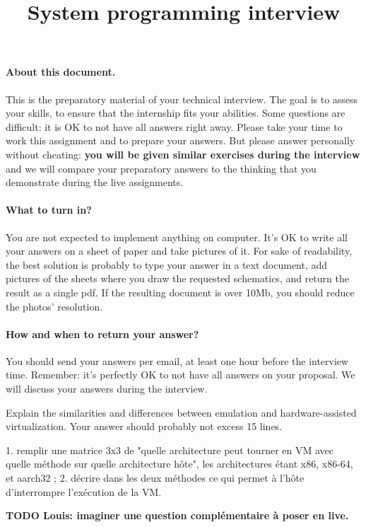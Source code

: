 \documentclass[10pt]{article}\usepackage[enonce]{exemptty}
\begin{document}
\title{System programming interview}
\TDmodule{}
\rhead{}
\maketitle

\vspace{-2\baselineskip}
\paragraph{About this document.}
This is the preparatory material of your technical interview. The goal is to
assess your skills, to ensure that the internship fits your abilities. Some
questions are difficult: it is OK to not have all answers right away. Please
take your time to work this assignment and to prepare your answers. But please
answer personally without cheating: \textbf{you will be given similar exercises
  during the interview} and we will compare your preparatory answers to the
thinking that you demonstrate during the live assignments.

\vspace{-.7\baselineskip}
\paragraph{What to turn in?} You are not expected to implement anything on
computer. It's OK to write all your answers on a sheet of paper and take
pictures of it. For sake of readability, the best solution is probably to type
your answer in a text document, add pictures of the sheets where you draw the
requested schematics, and return the result as a single pdf. If the resulting
document is over 10Mb, you should reduce the photos' resolution.

\vspace{-.7\baselineskip}
\paragraph{How and when to return your answer?} You should send your answers per
email, at least one hour before the interview time. Remember: it's perfectly OK
to not have all answers on your proposal. We will discuss your answers during
the interview.

\bigskip
\Exercise Explain the similarities and differences between emulation and
hardware-assisted virtualization. Your answer should probably not excess 15 lines.

\begin{Reponse}
1. remplir une matrice 3x3 de "quelle architecture peut tourner en VM avec quelle méthode sur quelle architecture hôte", les architectures étant x86, x86-64, et aarch32 ;
2. décrire dans les deux méthodes ce qui permet à l'hôte d'interrompre l'exécution de la VM.

\textbf{\color{red}TODO Louis: imaginer une question complémentaire à poser en live.}  
\end{Reponse}
\end{document}
